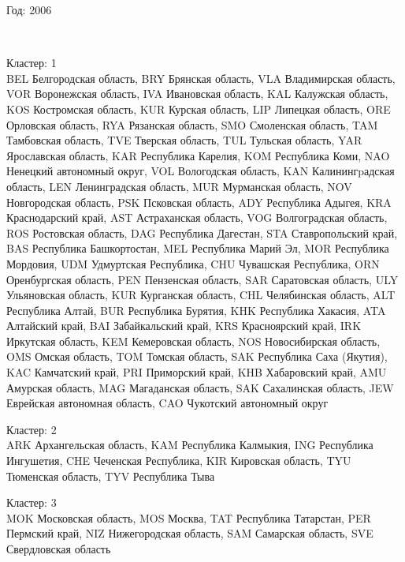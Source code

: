 \documentclass[11pt]{article}
\begin{document}
\begin{center}
Год:  2006
\end{center}

    \begin{center}
    \end{center}
    { \hspace*{\fill} \\}
    

Кластер:  1 \\
BEL Белгородская область, BRY Брянская область, VLA Владимирская область, VOR Воронежская область, IVA Ивановская область, KAL Калужская область, KOS Костромская область, KUR Курская область, LIP Липецкая область, ORE Орловская область, RYA Рязанская область, SMO Смоленская область, TAM Тамбовская область, TVE Тверская область, TUL Тульская область, YAR Ярославская область, KAR Республика Карелия, KOM Республика Коми, NAO Ненецкий автономный округ, VOL Вологодская область, KAN Калинингpадская область, LEN Ленинградская область, MUR Мурманская область, NOV Новгородская область, PSK Псковская область, ADY Республика Адыгея, KRA Краснодарский край, AST Астраханская область, VOG Волгоградская область, ROS Ростовская область, DAG Республика Дагестан, STA Ставропольский край, BAS Республика Башкортостан, MEL Республика Марий Эл, MOR Республика Мордовия, UDM Удмуртская Республика, CHU Чувашская Республика, ORN Оренбургская область, PEN Пензенская область, SAR Саратовская область, ULY Ульяновская область, KUR Курганская область, CHL Челябинская область, ALT Республика Алтай, BUR Республика Бурятия, KHK Республика Хакасия, ATA Алтайский край, BAI Забайкальский край, KRS Красноярский край, IRK Иркутская область, KEM Кемеровская область, NOS Новосибирская область, OMS Омская область, TOM Томская область, SAK Республика Саха (Якутия), KAC Камчатский край, PRI Приморский край, KHB Хабаровский край, AMU Амурская область, MAG Магаданская область, SAK Сахалинская область, JEW Еврейская автономная область, CAO Чукотский автономный округ

Кластер:  2 \\
ARK Архангельская область, KAM Республика Калмыкия, ING Республика Ингушетия, CHE Чеченская Республика, KIR Кировская область, TYU Тюменская область, TYV Республика Тыва

Кластер:  3 \\
MOK Московская область, MOS Москва, TAT Республика Татарстан, PER Пермский край, NIZ Нижегородская область, SAM Самарская область, SVE Свердловская область
\end{document}
